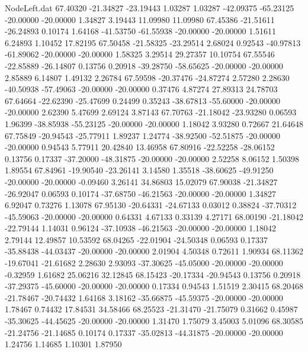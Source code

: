 \begin{filecontents}{NodeLeft.dat}
  67.40320  -21.34827  -23.19443     1.03287    1.03287  -42.09375  -65.23125  -20.00000  -20.00000    1.34827    3.19443   11.09980   11.09980
  67.45386  -21.51611  -26.24893     0.10174    1.64168  -41.53750  -61.55938  -20.00000  -20.00000    1.51611    6.24893    1.10452   17.82195
  67.50458  -21.58325  -23.29514     2.68024    0.92543  -40.97813  -61.89062  -20.00000  -20.00000    1.58325    3.29514   29.27357   10.10754
  67.55546  -22.85889  -26.14807     0.13756    0.20918  -39.28750  -58.65625  -20.00000  -20.00000    2.85889    6.14807    1.49132    2.26784
  67.59598  -20.37476  -24.87274     2.57280    2.28630  -40.50938  -57.49063  -20.00000  -20.00000    0.37476    4.87274   27.89313   24.78703
  67.64664  -22.62390  -25.47699     0.24499    0.35243  -38.67813  -55.60000  -20.00000  -20.00000    2.62390    5.47699    2.69124    3.87143
  67.70763  -21.18042  -23.93280     0.06593    1.96399  -38.85938  -55.23125  -20.00000  -20.00000    1.18042    3.93280    0.72667   21.64648
  67.75849  -20.94543  -25.77911     1.89237    1.24774  -38.92500  -52.51875  -20.00000  -20.00000    0.94543    5.77911   20.42840   13.46958
  67.80916  -22.52258  -28.06152     0.13756    0.17337  -37.20000  -48.31875  -20.00000  -20.00000    2.52258    8.06152    1.50398    1.89554
  67.84961  -19.90540  -23.26141     3.14580    1.35518  -38.60625  -49.91250  -20.00000  -20.00000   -0.09460    3.26141   34.86803   15.02079
  67.90038  -21.34827  -26.92047     0.06593    0.10174  -37.68750  -46.21563  -20.00000  -20.00000    1.34827    6.92047    0.73276    1.13078
  67.95130  -20.64331  -24.67133     0.03012    0.38824  -37.70312  -45.59063  -20.00000  -20.00000    0.64331    4.67133    0.33139    4.27171
  68.00190  -21.18042  -22.79144     1.14031    0.96124  -37.10938  -46.21563  -20.00000  -20.00000    1.18042    2.79144   12.49857   10.53592
  68.04265  -22.01904  -24.50348     0.06593    0.17337  -35.88438  -44.03437  -20.00000  -20.00000    2.01904    4.50348    0.72611    1.90934
  68.11362  -19.67041  -21.61682     2.28630    2.93093  -37.30625  -45.05000  -20.00000  -20.00000   -0.32959    1.61682   25.06216   32.12845
  68.15423  -20.17334  -20.94543     0.13756    0.20918  -37.29375  -45.60000  -20.00000  -20.00000    0.17334    0.94543    1.51519    2.30415
  68.20468  -21.78467  -20.74432     1.64168    3.18162  -35.66875  -45.59375  -20.00000  -20.00000    1.78467    0.74432   17.84531   34.58466
  68.25523  -21.31470  -21.75079     0.31662    0.45987  -35.30625  -44.45625  -20.00000  -20.00000    1.31470    1.75079    3.45003    5.01096
  68.30585  -21.24756  -21.14685     0.10174    0.17337  -35.02813  -44.31875  -20.00000  -20.00000    1.24756    1.14685    1.10301    1.87950

\end{filecontents}
